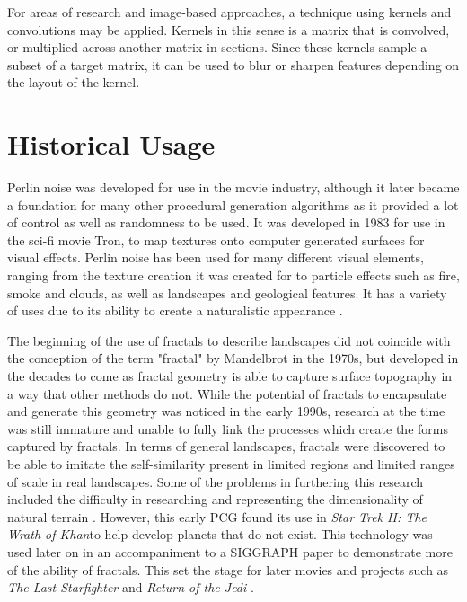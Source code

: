 \documentclass[10pt]{report}
\begin{document}
		For areas of research and image-based approaches, a technique using kernels and convolutions may be applied. Kernels in this sense is a matrix that is convolved, or multiplied across another matrix in sections. Since these kernels sample a subset of a target matrix, it can be used to blur or sharpen features depending on the layout of the kernel. 
		
	\vspace{10pt}
	\let\clearpage\relax
	\chapter{Historical Usage}
		
		Perlin noise was developed for use in the movie industry, although it later became a foundation for many other procedural generation algorithms as it provided a lot of control as well as randomness to be used. It was developed in 1983 for use in the sci-fi movie Tron, to map textures onto computer generated surfaces for visual effects. Perlin noise has been used for many different visual elements, ranging from the texture creation it was created for to particle effects such as fire, smoke and clouds, as well as landscapes and geological features. It has a variety of uses due to its ability to create a naturalistic appearance \cite{10.1145/325165.325247}.

		The beginning of the use of fractals to describe landscapes did not coincide with the conception of the term "fractal" by Mandelbrot in the 1970s, but developed in the decades to come as fractal geometry is able to capture surface topography in a way that other methods do not. While the potential of fractals to encapsulate and generate this geometry was noticed in the early 1990s, research at the time was still immature and unable to fully link the processes which create the forms captured by fractals. In terms of general landscapes, fractals were discovered to be able to imitate the self-similarity present in limited regions and limited ranges of scale in real landscapes. Some of the problems in furthering this research included the difficulty in researching and representing the dimensionality of natural terrain \cite{XU1993245}. However, this early PCG found its use in \emph{Star Trek II: The Wrath of Khan}to help develop planets that do not exist. This technology was used later on in an accompaniment to a SIGGRAPH paper to demonstrate more of the ability of fractals. This set the stage for later movies and projects such as \emph{The Last Starfighter} and \emph{Return of the Jedi} \cite{ibm-fractal}. 
		
\end{document}
